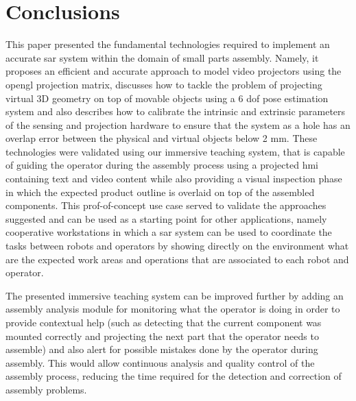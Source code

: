 \section{Conclusions}\label{sec:conclusions}

This paper presented the fundamental technologies required to implement an accurate \gls{sar} system within the domain of small parts assembly. Namely, it proposes an efficient and accurate approach to model video projectors using the \gls{opengl} projection matrix, discusses how to tackle the problem of projecting virtual 3D geometry on top of movable objects using a 6 \gls{dof} pose estimation system and also describes how to calibrate the intrinsic and extrinsic parameters of the sensing and projection hardware to ensure that the system as a hole has an overlap error between the physical and virtual objects below 2 mm. These technologies were validated using our immersive teaching system, that is capable of guiding the operator during the assembly process using a projected \gls{hmi} containing text and video content while also providing a visual inspection phase in which the expected product outline is overlaid on top of the assembled components. This prof-of-concept use case served to validate the approaches suggested and can be used as a starting point for other applications, namely cooperative workstations in which a \gls{sar} system can be used to coordinate the tasks between robots and operators by showing directly on the environment what are the expected work areas and operations that are associated to each robot and operator.

The presented immersive teaching system can be improved further by adding an assembly analysis module for monitoring what the operator is doing in order to provide contextual help (such as detecting that the current component was mounted correctly and projecting the next part that the operator needs to assemble) and also alert for possible mistakes done by the operator during assembly. This would allow continuous analysis and quality control of the assembly process, reducing the time required for the detection and correction of assembly problems.

